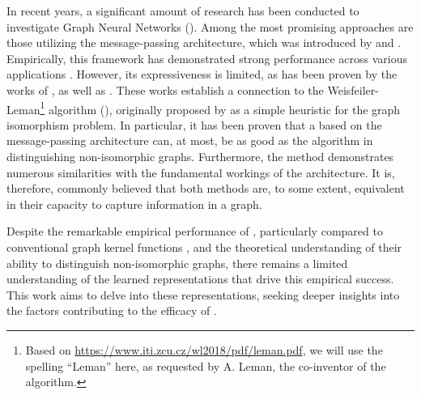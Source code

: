 In recent years, a significant amount of research has been conducted to investigate \textsf{Graph Neural Networks} (\gnns). Among the most promising approaches are those utilizing the message-passing architecture, which was introduced by \cite{Sca+2009} and \cite{Gil+2017}. 
Empirically, this framework has demonstrated strong performance across various applications \cite{Kip+2017, Ham+2017, Xu2018}. However, its expressiveness is limited, as has been proven by the works of \cite{Morris2018}, as well as \cite{Xu2018}. These works establish a connection to the \textsf{Weisfeiler-Leman}\footnote{Based on \href{https://www.iti.zcu.cz/wl2018/pdf/leman.pdf}{https://www.iti.zcu.cz/wl2018/pdf/leman.pdf}, we will use the spelling ``Leman'' here, as requested by A. Leman, the co-inventor of the algorithm.} algorithm (\wl), originally proposed by \cite{Wei+1968} as a simple heuristic for the graph isomorphism problem. In particular, it has been proven that a \gnn based on the message-passing architecture can, at most, be as good as the \wl algorithm in distinguishing non-isomorphic graphs. Furthermore, the \wl method demonstrates numerous similarities with the fundamental workings of the \gnn architecture. It is, therefore, commonly believed that both methods are, to some extent, equivalent in their capacity to capture information in a graph.

Despite the remarkable empirical performance of \gnns, particularly compared to conventional graph kernel functions \cite{Mor+2020}, and the theoretical understanding of their ability to distinguish non-isomorphic graphs, there remains a limited understanding of the learned representations that drive this empirical success. This work aims to delve into these representations, seeking deeper insights into the factors contributing to the efficacy of \gnns.

